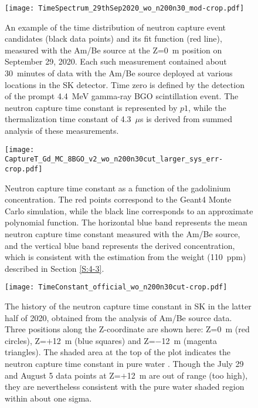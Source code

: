 \documentclass[preprint,12pt]{elsarticle}
\begin{document}
\begin{figure}[htb]
	\centering\texttt{[image: TimeSpectrum\_29thSep2020\_wo\_n200n30\_mod-crop.pdf]}
	\caption{An example of the time distribution of neutron capture event candidates (black data points) and its fit function (red line), measured with the Am/Be source at the Z=0~m position on September 29, 2020. Each such measurement contained about 30~minutes of data with the Am/Be source deployed at various locations in the SK detector. Time zero is defined by the detection of the prompt 4.4~MeV gamma-ray BGO scintillation event. 
	The neutron capture time constant is represented by $p1$, while the thermalization time constant of 4.3~$\mu$s is derived from summed analysis of these measurements. 
	}
	\label{fig:TimeSpectrum_29thSep2020}
\end{figure}
\begin{figure}[htb]
	\centering\texttt{[image: CaptureT\_Gd\_MC\_8BGO\_v2\_wo\_n200n30cut\_larger\_sys\_err-crop.pdf]}
	\caption{Neutron capture time constant as a function of the gadolinium concentration.
	The red points correspond to the Geant4 Monte Carlo simulation, while the black line corresponds to an approximate polynomial function. %
	The horizontal blue band represents the mean neutron capture time constant measured with the Am/Be source, and the vertical blue band represents the derived concentration, which is consistent with the estimation from the weight (110~ppm) described in Section \ref{S:4-3}.
	}
	\label{fig:CaptureT_Gd_MC}
\end{figure}
\begin{figure}[htb]
	\centering\texttt{[image: TimeConstant\_official\_wo\_n200n30cut-crop.pdf]}
	\caption{The history of the neutron capture time constant in SK in the latter half of 2020, obtained from the analysis of Am/Be source data.
	Three positions along the Z-coordinate
	are shown here: Z=0~m (red circles), Z=$+$12~m (blue squares) and Z=$-$12~m (magenta triangles).
	The shaded area at the top of the plot indicates the neutron capture time constant in pure water
	\cite{Super-Kamiokande:2015xra}.
	Though the July 29 and August 5 data points at Z=$+$12~m are out of range (too high), they are nevertheless consistent with the pure water shaded region within about one sigma.
	}
	\label{fig:History_Of_GdCaptureTime}
\end{figure}
\end{document}
